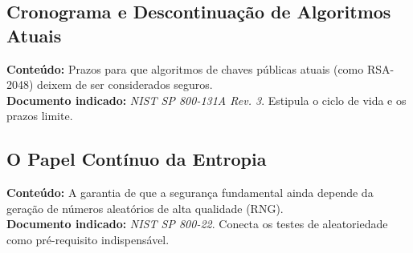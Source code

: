 \subsection{Cronograma e Descontinuação de Algoritmos Atuais}
\textbf{Conteúdo:} Prazos para que algoritmos de chaves públicas atuais (como RSA-2048) deixem de ser considerados seguros.\\
\textbf{Documento indicado:} \textit{NIST SP 800-131A Rev. 3}. Estipula o ciclo de vida e os prazos limite.

\subsection{O Papel Contínuo da Entropia}
\textbf{Conteúdo:} A garantia de que a segurança fundamental ainda depende da geração de números aleatórios de alta qualidade (RNG).\\
\textbf{Documento indicado:} \textit{NIST SP 800-22}. Conecta os testes de aleatoriedade como pré-requisito indispensável.